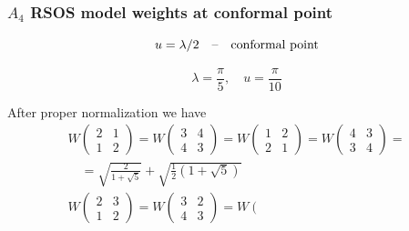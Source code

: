 \documentclass[pdftex]{beamer}
\theoremstyle{definition} \newtheorem{Def}{Definition}
\begin{document}
\begin{frame}
  \frametitle{$A_4$ RSOS model weights at conformal point}
  \begin{equation}
    \label{eq:7}
    u=\lambda/2\quad \mbox{--\quad conformal point}
  \end{equation}

  \begin{equation}
    \label{eq:8}
    \lambda = \frac{\pi}{5}, \quad u=\frac{\pi}{10}
  \end{equation}

  After proper normalization we have
  \begin{equation}
    \label{eq:12}
    \begin{array}{l}
      W\left(                                          
        \begin{array}{cc}
          2 & 1 \\
          1 & 2
        \end{array}
      \right)=
      W\left(
        \begin{array}{cc}
          3 & 4 \\
          4 & 3
        \end{array}
      \right)=   W\left(                                         
        \begin{array}{cc}
          1 & 2 \\
          2 & 1
        \end{array}
      \right)= 
      W\left(                                                  
        \begin{array}{cc}
          4 & 3 \\
          3 & 4
        \end{array}
      \right)=\\\quad=\sqrt{\frac{2}{1+\sqrt{5}}}+\sqrt{\frac{1}{2}\left(1+\sqrt{5}\right)}\\
      W\left(                                      
        \begin{array}{cc}
          2 & 3 \\
          1 & 2
        \end{array}
      \right)=
      W\left(                                         
        \begin{array}{cc}
          3 & 2 \\
          4 & 3
        \end{array}
      \right)=    W\left(                                         
        \begin{array}{cc}

\end{array}
\end{array}
\end{equation}
\end{frame}
\end{document}
